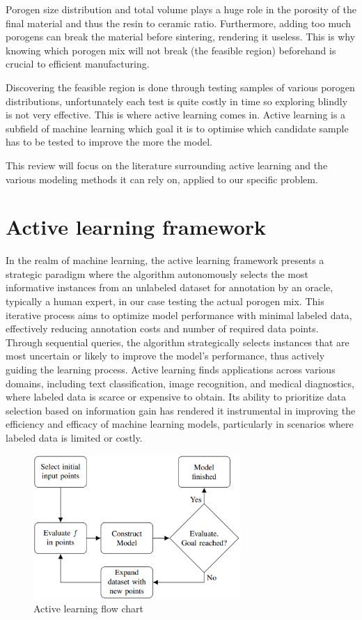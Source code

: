 \documentclass[11pt]{article}
\begin{document}
Porogen size distribution and total volume plays a huge role in the porosity of the final material and thus the resin to ceramic ratio. Furthermore, adding too much porogens can break the material before sintering, rendering it useless. This is why knowing which porogen mix will not break (the feasible region) beforehand is crucial to efficient manufacturing.

Discovering the feasible region is done through testing samples of various porogen distributions, unfortunately each test is quite costly in time so exploring blindly is not very effective. This is where active learning comes in. Active learning is a subfield of machine learning which goal it is to optimise which candidate sample has to be tested to improve the more the model.

This review will focus on the literature surrounding active learning and the various modeling methods it can rely on, applied to our specific problem.

\section{Active learning framework}
In the realm of machine learning, the active learning framework presents a strategic paradigm where the algorithm autonomously selects the most informative instances from an unlabeled dataset for annotation by an oracle, typically a human expert, in our case testing the actual porogen mix\cite{settles_active_2009}. This iterative process aims to optimize model 
performance with minimal labeled data, effectively reducing annotation costs and number of required data points. Through sequential queries, the algorithm strategically selects instances that are most uncertain or likely to improve the model's performance, thus actively guiding the learning process. Active learning finds applications across various domains, including text classification, image recognition, and medical diagnostics, where labeled data is scarce or expensive to obtain. Its ability to prioritize data selection based on information gain has rendered it instrumental in improving the efficiency and efficacy of machine learning models, particularly in scenarios where labeled data is limited or costly.

\begin{figure}[H]
  \centering
  \includegraphics[width=0.7\textwidth]{ActiveLearning.png}
  \caption{Active learning flow chart}\label{fig:active}
\end{figure}
\end{document}
